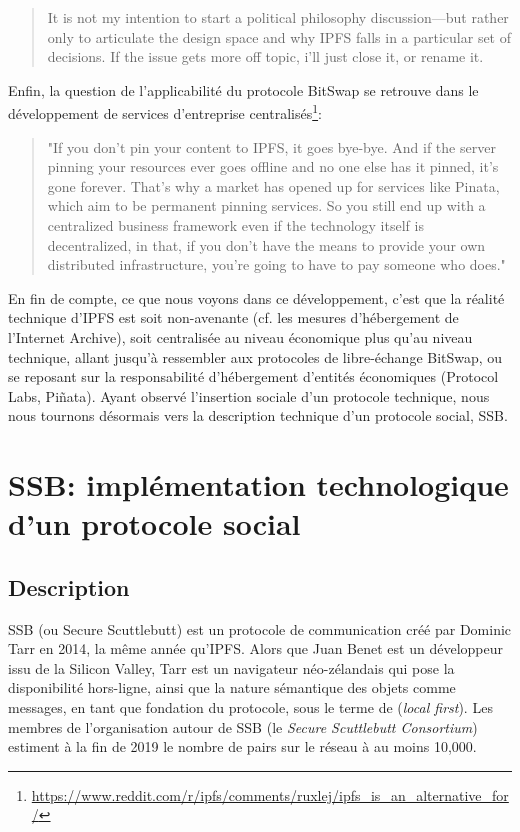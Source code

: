 \documentclass{article}
\begin{document}
\begin{quote}
    It is not my intention to start a political philosophy discussion—but rather only to articulate the design space and why IPFS falls in a particular set of decisions. If the issue gets more off topic, i'll just close it, or rename it.\cite{benet_editingdeletion_2017}
\end{quote}

Enfin, la question de l'applicabilité du protocole BitSwap se retrouve dans le développement de services d'entreprise centralisés\footnote{\url{https://www.reddit.com/r/ipfs/comments/ruxlej/ipfs_is_an_alternative_for/}}:

\begin{quote}
    "If you don't pin your content to IPFS, it goes bye-bye. And if the server pinning your resources ever goes offline and no one else has it pinned, it's gone forever. That's why a market has opened up for services like Pinata, which aim to be permanent pinning services. So you still end up with a centralized business framework even if the technology itself is decentralized, in that, if you don't have the means to provide your own distributed infrastructure, you're going to have to pay someone who does." 
\end{quote}

En fin de compte, ce que nous voyons dans ce développement, c'est que la réalité technique d'IPFS est soit non-avenante (cf. les mesures d'hébergement de l'Internet Archive), soit centralisée au niveau économique plus qu'au niveau technique, allant jusqu'à ressembler aux protocoles de libre-échange BitSwap, ou se reposant sur la responsabilité d'hébergement d'entités économiques (Protocol Labs, Piñata). Ayant observé l'insertion sociale d'un protocole technique, nous nous tournons désormais vers la description technique d'un protocole social, SSB.

\section{SSB: implémentation technologique d'un protocole social}

\subsection{Description}

SSB (ou Secure Scuttlebutt) est un protocole de communication créé par Dominic Tarr en 2014, la même année qu'IPFS. Alors que Juan Benet est un développeur issu de la Silicon Valley, Tarr est un navigateur néo-zélandais qui pose la disponibilité hors-ligne, ainsi que la nature sémantique des objets comme messages, en tant que fondation du protocole, sous le terme de (\emph{local first}). Les membres de l'organisation autour de SSB (le \emph{Secure Scuttlebutt Consortium}) estiment à la fin de 2019 le nombre de pairs sur le réseau à au moins 10,000\cite{fiscella_35c3_2018}.
\end{document}

